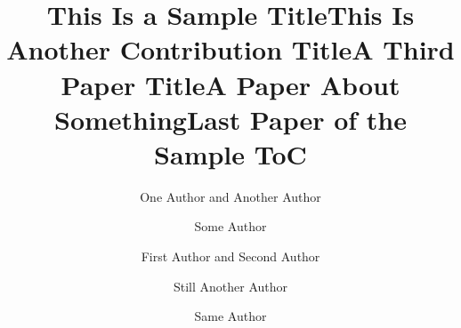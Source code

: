 \documentclass[runningheads]{llncs}
\begin{document}
\tableofcontents

\mainmatter


\setcounter{page}{1}
\author{One Author and Another Author}
\title{This Is a Sample Title}
\maketitle
\clearpage

\setcounter{page}{11}
\author{Some Author}
\title{This Is Another Contribution Title}
\maketitle
\clearpage

\setcounter{page}{21}
\author{First Author and Second Author}
\title{A Third Paper Title}
\maketitle
\clearpage

\setcounter{page}{31}
\author{Still Another Author}
\title{A Paper About Something}
\maketitle
\clearpage

\setcounter{page}{41}
\author{Same Author}
\title{Last Paper of the Sample ToC}
\maketitle
\clearpage

\setcounter{page}{51}
\phantom{Author Index}
\clearpage
\end{document}

